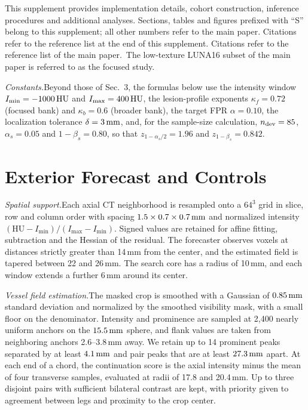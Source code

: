 \clearpage
\setcounter{page}{1}
\maketitlesupplementary
\renewcommand{\thesection}{S\arabic{section}}
\renewcommand{\thetable}{S\arabic{table}}
\renewcommand{\thefigure}{S\arabic{figure}}
\setcounter{section}{0}\setcounter{table}{0}\setcounter{figure}{0}
\noindent This supplement provides implementation details, cohort construction, inference procedures and additional analyses. Sections, tables and figures prefixed with ``S'' belong to this supplement; all other numbers refer to the main paper.\ifdefined\suppstandalone{} Citations refer to the reference list at the end of this supplement.\else{} Citations refer to the reference list of the main paper.\fi\  The low-texture LUNA16 subset of the main paper is referred to as the focused study.

\smallskip\noindent\textit{Constants.}\enspace Beyond those of Sec.~3, the formulas below use the intensity window $I_{\min}=-1000\,\mathrm{HU}$ and $I_{\max}=400\,\mathrm{HU}$, the lesion-profile exponents $\kappa_f=0.72$ (focused bank) and $\kappa_b=0.6$ (broader bank), the target FPR $\alpha=0.10$, the localization tolerance $\delta=3\,\mathrm{mm}$, and, for the sample-size calculation, $n_{\rm dev}=85$, $\alpha_s=0.05$ and $1-\beta_s=0.80$, so that $z_{1-\alpha_s/2}=1.96$ and $z_{1-\beta_s}=0.842$.

\section{Exterior Forecast and Controls}
\label{supp:fit}
\smallskip\noindent\textit{Spatial support.}\enspace Each axial CT neighborhood is resampled onto a $64^3$ grid in slice, row and column order with spacing $1.5\times0.7\times0.7\,\mathrm{mm}$ and normalized intensity $(\mathrm{HU}-I_{\min})/(I_{\max}-I_{\min})$. Signed values are retained for affine fitting, subtraction and the Hessian of the residual. The forecaster observes voxels at distances strictly greater than 14\,mm from the center, and the estimated field is tapered between 22 and 26\,mm. The search core has a radius of 10\,mm, and each window extends a further 6\,mm around its center.

\smallskip\noindent\textit{Vessel field estimation.}\enspace The masked crop is smoothed with a Gaussian of $0.85\,\mathrm{mm}$ standard deviation and normalized by the smoothed visibility mask, with a small floor on the denominator. Intensity and prominence are sampled at 2,400 nearly uniform anchors on the $15.5\,\mathrm{mm}$ sphere, and flank values are taken from neighboring anchors 2.6--3.8\,mm away. We retain up to 14 prominent peaks separated by at least $4.1\,\mathrm{mm}$ and pair peaks that are at least $27.3\,\mathrm{mm}$ apart. At each end of a chord, the continuation score is the axial intensity minus the mean of four transverse samples, evaluated at radii of 17.8 and 20.4\,mm. Up to three disjoint pairs with sufficient bilateral contrast are kept, with priority given to agreement between legs and proximity to the crop center.

